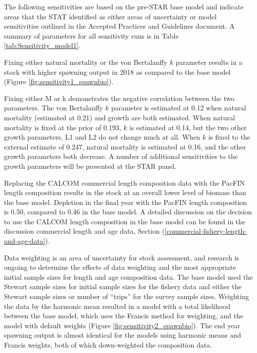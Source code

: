 \documentclass[12pt,]{article}
\begin{document}
The following sensitivities are based on the pre-STAR base model and
indicate areas that the STAT identified as either areas of uncertainty
or model sensitivities outlined in the Accepted Practices and Guidelines
document. A summary of parameters for all sensitivity runs is in Table
\ref{tab:Sensitivity_model1}.

Fixing either natural mortality or the von Bertalanffy \(k\) parameter
results in a stock with higher spawning output in 2018 as compared to
the base model (Figure \ref{fig:sensitivity1_spawnbio}).

Fixing either M or k demonstrates the negative correlation between the
two parameters. The von Bertalanffy \(k\) parameter is estimated at 0.12
when natural mortality (estimated at 0.21) and growth are both
estimated. When natural mortality is fixed at the prior of 0.193, \(k\)
is estimated at 0.14, but the two other growth parameters, L1 and L2 do
not change much at all. When \(k\) is fixed to the external estimate of
0.247, natural mortality is estimated at 0.16, and the other growth
parameters both decrease. A number of additional sensitivities to the
growth parameters will be presented at the STAR panel.

Replacing the CALCOM commercial length composition data with the PacFIN
length composition results in the stock at an overall lower level of
biomass than the base model. Depletion in the final year with the PacFIN
length composition is 0.50, compared to 0.46 in the base model. A
detailed discussion on the decision to use the CALCOM length composition
in the base model can be found in the discussion commercial length and
age data, Section (\ref{commercial-fishery-length-and-age-data}).

Data weighting is an area of uncertainty for stock assessment, and
research is ongoing to determine the effects of data weighting and the
most appropriate initial sample sizes for length and age composition
data. The base model used the Stewart sample sizes for initial sample
sizes for the fishery data and either the Stewart sample sizes or number
of ``trips'' for the survey sample sizes. Weighting the data by the
harmonic mean resulted in a model with a total likelihood between the
base model, which uses the Francis method for weighting, and the model
with default weights (Figure \ref{fig:sensitivity2_spawnbio}). The end
year spawning output is almost identical for the models using harmonic
means and Francis weights, both of which down-weighted the composition
data.
\end{document}
